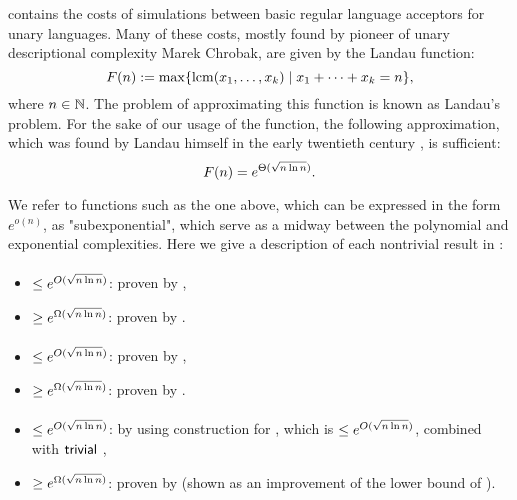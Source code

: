  contains the costs of simulations between basic regular language acceptors for unary languages.
Many of these costs, mostly found by pioneer of unary descriptional complexity Marek Chrobak, are given by the Landau function:
\begin{equation}
	F(n) := \max\{\operatorname{lcm}(x_1,\dots,x_k)\mid x_1+\dots+x_k=n\} \text,
\end{equation}
where $n\in\mathbb N$.
The problem of approximating this function is known as Landau's problem.
For the sake of our usage of the function, the following approximation, which was found by Landau himself in the early twentieth century \cite{Lan03,Lan09}, is sufficient:
\begin{equation}
	F(n) = e^{\Theta(\sqrt{n\ln n})} \text.
\end{equation}

We refer to functions such as the one above, which can be expressed in the form $e^{o(n)}$, as "subexponential", which serve as a midway between the polynomial and exponential complexities.
Here we give a description of each nontrivial result in :

\paragraph{\ONFA{}\tto\ODFA}
\begin{itemize}
	\item $\le e^{O(\sqrt{n\ln n})}$: proven by ,
	\item $\ge e^{\Omega(\sqrt{n\ln n})}$: proven by .
\end{itemize}
\paragraph{\TDFA{}\tto\ODFA}\label{cost:2DFAto1DFAu}
\begin{itemize}
	\item $\le e^{O(\sqrt{n\ln n})}$: proven by ,
	\item $\ge e^{\Omega(\sqrt{n\ln n})}$: proven by .
\end{itemize}
\paragraph{\TDFA{}\tto\ONFA}\label{cost:2DFAto1NFAu}
\begin{itemize}
	\item $\le e^{O(\sqrt{n\ln n})}$: by using construction for \hyperref[cost:2DFAto1DFAu]{\TDFA{}\tto\ODFA}, which is $\le e^{O(\sqrt{n\ln n})}$, combined with $\mathsf{trivial}$ \ODFA{}\tto\ONFA,
	\item $\ge e^{\Omega(\sqrt{n\ln n})}$: proven by  (shown as an improvement of the lower bound of \hyperref[cost:2DFAto1DFAu]{\TDFA{}\tto\ODFA}).
\end{itemize}
